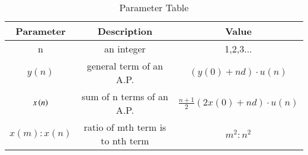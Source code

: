 \begin{table}[H]
    \center
    \renewcommand\thetable{1}
 

\def\arraystretch{3}
\begin{adjustbox}{width=0.5\textwidth}
    \begin{tabular}{|c|c|c|}
    \hline
        \textbf{Parameter}&\textbf{Description}&\textbf{Value}\\
        \hline
        n&an integer&1,2,3...\\
        \hline
        $y(n)$& general term of an A.P.&$(y(0)+nd)\cdot{u(n)}$ \\
        \hline
        $x\left(n\right)$ &sum of n terms of an A.P.&$ \frac{n+1}{2}(2x(0)+nd)\cdot{u(n)}$ \\
        \hline
        $x(m):x(n)$&ratio of mth term is to nth term&$m^2:n^2$ \\
      \hline
       \end{tabular} 
            \end{adjustbox}
    \caption{Parameter Table}

    \label{tab:11.9.2.12.1}
\end{table}
